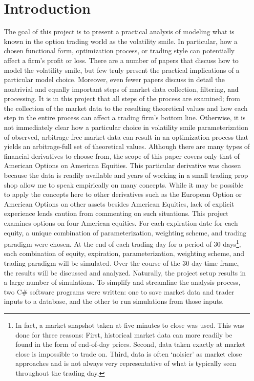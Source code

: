 \documentclass[12pt, a4paper, notitlepage]{article}
\numberwithin{equation}{subsection}
\numberwithin{figure}{subsection}
\numberwithin{table}{subsection}
\newcommand{\newpar}{\newline \newline}
\begin{document}
\section{Introduction} \label{sec:Introduction}
The goal of this project is to present a practical analysis of modeling what is known in the option trading world as the volatility smile.  In particular, how a chosen functional form, optimization process, or trading style can potentially affect a firm's profit or loss.  There are a number of papers that discuss how to model the volatility smile, but few truly present the practical implications of a particular model choice.  Moreover, even fewer papers discuss in detail the nontrivial and equally important steps of market data collection, filtering, and processing.  It is in this project that all steps of the process are examined;  from the collection of the market data to the resulting theoretical values and how each step in the entire process can affect a trading firm's bottom line.  Otherwise, it is not immediately clear how a particular choice in volatility smile parameterization of observed, arbitrage-free market data can result in an optimization process that yields an arbitrage-full set of theoretical values.
\newpar
Although there are many types of financial derivatives to choose from, the scope of this paper covers only that of American Options on American Equities.  This particular derivative was chosen because the data is readily available and years of working in a small trading prop shop allow me to speak empirically on many concepts.  While it may be possible to apply the concepts here to other derivatives such as the European Option or American Options on other assets besides American Equities, lack of explicit experience lends caution from commenting on such situations.
\newpar
This project examines options on four American equities.  For each expiration date for each equity, a unique combination of parameterization, weighting scheme, and trading paradigm were chosen.  At the end of each trading day for a period of 30 days\footnote{In fact, a market snapshot taken at five minutes to close was used.  This was done for three reasons:  First, historical market data can more readily be found in the form of end-of-day prices.  Second, data taken exactly at market close is impossible to trade on.  Third, data is often `noisier' as market close approaches and is not always very representative of what is typically seen throughout the trading day.}, each combination of equity, expiration, parameterization, weighting scheme, and trading paradigm will be simulated.  Over the course of the 30 day time frame, the results will be discussed and analyzed.
\newpar
Naturally, the project setup results in a large number of simulations.  To simplify and streamline the analysis process, two C\# software programs were written: one to save market data and trader inputs to a database, and the other to run simulations from those inputs.
\newpage
\end{document}
